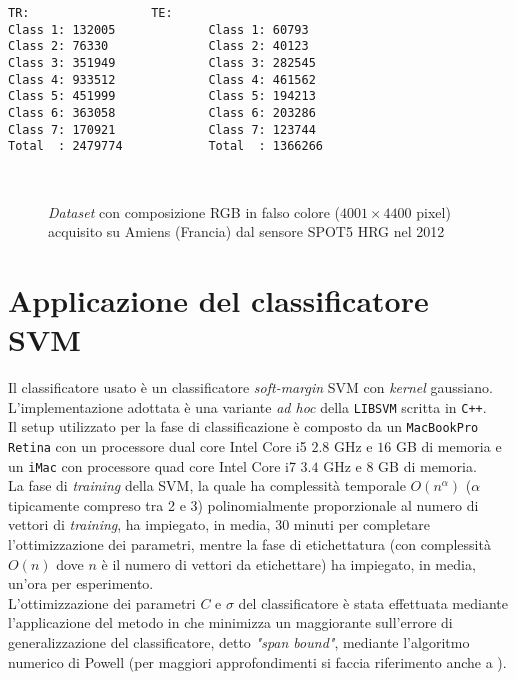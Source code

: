 \begin{lstlisting}[float=t,title={Distribuzione dei pixel di training (TR) e test (TE) classe per classe.},
                   label=lst:esempio, frame=lines]
TR:					TE:
Class 1: 132005				Class 1: 60793
Class 2: 76330				Class 2: 40123
Class 3: 351949				Class 3: 282545
Class 4: 933512				Class 4: 461562
Class 5: 451999				Class 5: 194213
Class 6: 363058				Class 6: 203286
Class 7: 170921				Class 7: 123744
Total  : 2479774			Total  : 1366266
\end{lstlisting}
\clearpage

\begin{figure}[!ht]
   \center
   \\%
     \hspace{4mm}
    \caption{\emph{Dataset} con composizione RGB in falso colore ($4001\times4400$ pixel) acquisito su Amiens (Francia) dal sensore \textsc{SPOT5 HRG} nel 2012}
    \label{fig: Amiens122_5m}
  \end{figure}
\clearpage

\section{Applicazione del classificatore SVM}
Il classificatore usato è un classificatore \emph{soft-margin} SVM con \emph{kernel} gaussiano. L'implementazione adottata è una variante \emph{ad hoc} della \texttt{LIBSVM} \citep{art_libsvm}  scritta in \texttt{C++}.\\
Il setup utilizzato per la fase di classificazione è composto da un \texttt{MacBookPro Retina} con un processore dual core Intel Core i5 $2.8$ GHz e $16$ GB di memoria e un \texttt{iMac} con processore quad core Intel Core i7 $3.4$ GHz e $8$ GB di memoria. \\

La fase di \emph{training} della SVM, la quale ha complessità temporale $O(n^\alpha)$ ($\alpha$ tipicamente compreso tra 2 e 3) polinomialmente proporzionale al numero di vettori di \emph{training}, ha impiegato, in media, 30 minuti per completare l'ottimizzazione dei parametri, mentre la fase di etichettatura (con complessità $O(n)$ dove $n$ è il numero di vettori da etichettare) ha impiegato, in media, un'ora per esperimento.\\
L'ottimizzazione dei parametri $C$ e $\sigma$ del classificatore è stata effettuata mediante l'applicazione del metodo in \citep{art_ottsvm1} che minimizza un maggiorante sull'errore di generalizzazione del classificatore, detto \emph{"span bound"}, mediante l'algoritmo numerico di Powell (per maggiori approfondimenti si faccia riferimento anche a \citep{art_ottsvm2}).


